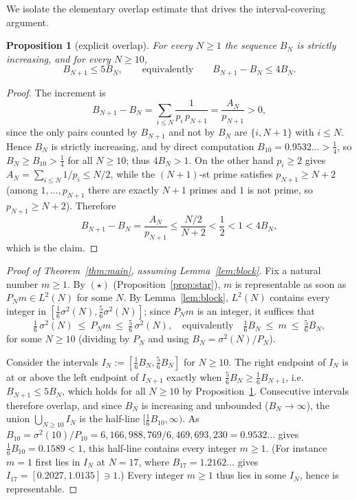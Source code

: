 \documentclass[11pt]{amsart}
\theoremstyle{plain}
\newtheorem{proposition}[theorem]{Proposition}
\theoremstyle{definition}
\begin{document}
We isolate the elementary overlap estimate that drives the interval-covering
argument.

\begin{proposition}[explicit overlap]\label{prop:overlap}
For every $N\ge 1$ the sequence $B_N$ is strictly increasing, and for every
$N\ge 10$,
\[
B_{N+1}\le 5B_N,\qquad\text{equivalently}\qquad B_{N+1}-B_N\le 4B_N .
\]
\end{proposition}

\begin{proof}
The increment is
\[
B_{N+1}-B_N=\sum_{i\le N}\frac1{p_i\,p_{N+1}}=\frac{A_N}{p_{N+1}}>0,
\]
since the only pairs counted by $B_{N+1}$ and not by $B_N$ are $\{i,N+1\}$ with
$i\le N$.  Hence $B_N$ is strictly increasing, and by direct computation
$B_{10}=0.9532\ldots>\tfrac14$, so $B_N\ge B_{10}>\tfrac14$ for all $N\ge 10$;
thus $4B_N>1$.  On the other hand $p_i\ge 2$ gives $A_N=\sum_{i\le N}1/p_i\le N/2$,
while the $(N+1)$-st prime satisfies $p_{N+1}\ge N+2$ (among $1,\dots,p_{N+1}$
there are exactly $N+1$ primes and $1$ is not prime, so $p_{N+1}\ge N+2$).
Therefore
\[
B_{N+1}-B_N=\frac{A_N}{p_{N+1}}\le\frac{N/2}{N+2}<\frac12<1<4B_N ,
\]
which is the claim.
\end{proof}

\begin{proof}[Proof of Theorem~\ref{thm:main}, assuming Lemma~\ref{lem:block}]
Fix a natural number $m\ge 1$.  By $(\star)$ (Proposition~\ref{prop:star}), $m$
is representable as soon as $P_N m\in L^2(N)$ for some $N$.  By
Lemma~\ref{lem:block}, $L^2(N)$ contains every integer in
$[\tfrac16\sigma^2(N),\tfrac56\sigma^2(N)]$; since $P_N m$ is an integer, it
suffices that
\[
\tfrac16\,\sigma^2(N)\ \le\ P_N m\ \le\ \tfrac56\,\sigma^2(N),
\quad\text{equivalently}\quad
\tfrac16 B_N\ \le\ m\ \le\ \tfrac56 B_N,
\]
for some $N\ge 10$ (dividing by $P_N$ and using $B_N=\sigma^2(N)/P_N$).

Consider the intervals $I_N:=[\tfrac16 B_N,\tfrac56 B_N]$ for $N\ge 10$.  The
right endpoint of $I_N$ is at or above the left endpoint of $I_{N+1}$ exactly
when $\tfrac56 B_N\ge\tfrac16 B_{N+1}$, i.e.\ $B_{N+1}\le 5B_N$, which holds for
all $N\ge 10$ by Proposition~\ref{prop:overlap}.  Consecutive intervals
therefore overlap, and since $B_N$ is increasing and unbounded
($B_N\to\infty$), the union $\bigcup_{N\ge 10} I_N$ is the half-line
$[\tfrac16 B_{10},\infty)$.  As
$B_{10}=\sigma^2(10)/P_{10}=6{,}166{,}988{,}769/6{,}469{,}693{,}230=0.9532\ldots$
gives $\tfrac16 B_{10}=0.1589<1$, this half-line
contains every integer $m\ge 1$.  (For instance $m=1$ first lies in $I_N$ at
$N=17$, where $B_{17}=1.2162\ldots$ gives $I_{17}=[0.2027,1.0135]\ni 1$.)  Every
integer $m\ge 1$ thus lies in some $I_N$, hence is representable.
\end{proof}
\end{document}
